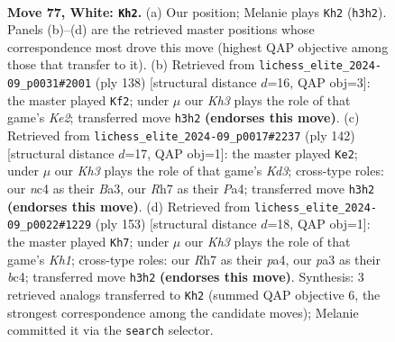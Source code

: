 \documentclass[11pt]{article}
\begin{document}
\clearpage

\begin{figure}[p]\centering
\begin{subfigure}{0.46\textwidth}\centering
\resizebox{\linewidth}{!}{%
\newchessgame
\chessboard[
  setfen={8/7R/6pP/3k1p2/2n2P2/p6K/8/8 w - - 0 77},
  showmover=false,
  pgfstyle=straightmove, color=movearrow, markmove={h3-h2}
]}
\caption{}
\end{subfigure}\hfill
\begin{subfigure}{0.46\textwidth}\centering
\resizebox{\linewidth}{!}{%
\newchessgame
\chessboard[
  setfen={8/8/8/4p3/2n1Pp2/2k2P2/4K3/8 w - - 4 70},
  showmover=false,
  pgfstyle=straightmove, color=movearrow, markmove={e2-f2}
]}
\caption{}
\end{subfigure}
\\[4pt]
\begin{subfigure}{0.46\textwidth}\centering
\resizebox{\linewidth}{!}{%
\newchessgame
\chessboard[
  setfen={8/2k5/p7/4p2p/P3P1nP/B2K4/8/8 w - - 20 72},
  showmover=false,
  pgfstyle=straightmove, color=movearrow, markmove={d3-e2}
]}
\caption{}
\end{subfigure}\hfill
\begin{subfigure}{0.46\textwidth}\centering
\resizebox{\linewidth}{!}{%
\newchessgame
\chessboard[
  setfen={7k/6p1/8/p6K/P1B4P/6P1/8/8 b - - 0 77},
  showmover=false,
  pgfstyle=straightmove, color=movearrow, markmove={h8-h7}
]}
\caption{}
\end{subfigure}
\caption{\textbf{Move 77, White: \texttt{Kh2}.} (a) Our position; Melanie plays \texttt{Kh2} (\texttt{h3h2}). Panels (b)--(d) are the retrieved master positions whose correspondence most drove this move (highest QAP objective among those that transfer to it). (b) Retrieved from \texttt{lichess\_elite\_2024-09\_p0031\#2001} (ply 138) [structural distance $d$=16, QAP obj=3]: the master played \texttt{Kf2}; under $\mu$ our \emph{Kh3} plays the role of that game's \emph{Ke2}; transferred move \texttt{h3h2} \textbf{(endorses this move)}. (c) Retrieved from \texttt{lichess\_elite\_2024-09\_p0017\#2237} (ply 142) [structural distance $d$=17, QAP obj=1]: the master played \texttt{Ke2}; under $\mu$ our \emph{Kh3} plays the role of that game's \emph{Kd3}; cross-type roles: our \emph{n}c4 as their \emph{B}a3, our \emph{R}h7 as their \emph{P}a4; transferred move \texttt{h3h2} \textbf{(endorses this move)}. (d) Retrieved from \texttt{lichess\_elite\_2024-09\_p0022\#1229} (ply 153) [structural distance $d$=18, QAP obj=1]: the master played \texttt{Kh7}; under $\mu$ our \emph{Kh3} plays the role of that game's \emph{Kh1}; cross-type roles: our \emph{R}h7 as their \emph{p}a4, our \emph{p}a3 as their \emph{b}c4; transferred move \texttt{h3h2} \textbf{(endorses this move)}. Synthesis: 3 retrieved analogs transferred to \texttt{Kh2} (summed QAP objective 6, the strongest correspondence among the candidate moves); Melanie committed it via the \texttt{search} selector.}
\label{fig:thought-m152}
\end{figure}
\end{document}
